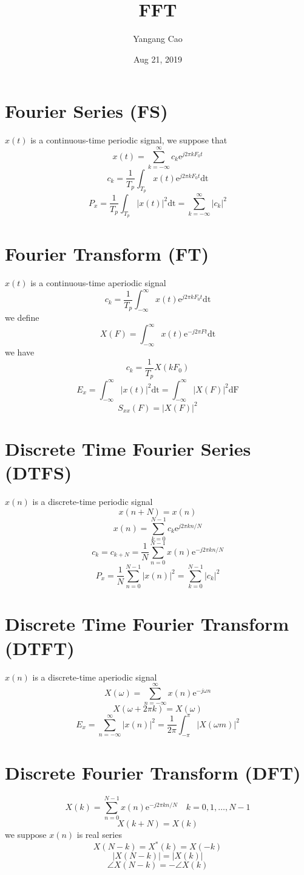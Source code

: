 \documentclass[10pt,a4paper,oneside]{article}
\author{Yangang Cao}
\date{Aug 21, 2019}
\begin{document}
\title{FFT}
\maketitle 
\tableofcontents
\newpage
\section{Fourier Series (FS)}
$x(t)$ is a continuous-time periodic signal, we suppose that
\[
x(t)=\sum_{k=-\infty}^{\infty}c_k\mathrm{e}^{j2\pi kF_0t}
\]
\[
c_k=\frac{1}{T_p}\int_{T_p}x(t)\mathrm{e}^{j2\pi kF_0t}\mathrm{dt}
\]
\[
P_x=\frac{1}{T_p}\int_{T_p}|x(t)|^2\mathrm{dt}=\sum_{k=-\infty}^{\infty}|c_k|^2
\]
\section{Fourier Transform (FT)}
$x(t)$ is a continuous-time aperiodic signal
\[
c_k=\frac{1}{T_p}\int_{-\infty}^{\infty}x(t)\mathrm{e}^{j2\pi kF_0t}\mathrm{dt}
\]
we define
\[
X(F)=\int_{-\infty}^{\infty}x(t)\mathrm{e}^{-j2\pi Ft}\mathrm{dt}
\]
we have
\[
c_k=\frac{1}{T_p}X(kF_0)
\]
\[
E_x=\int_{-\infty}^{\infty}|x(t)|^2\mathrm{dt}=\int_{-\infty}^{\infty}|X(F)|^2\mathrm{dF}
\]
\[
S_{xx}(F)=|X(F)|^2
\]
\section{Discrete Time Fourier Series (DTFS)}
$x(n)$ is a discrete-time periodic signal
\[
x(n+N)=x(n)
\]
\[
x(n)=\sum_{k=0}^{N-1}c_k\mathrm{e}^{j2\pi kn/N}
\]
\[
c_k=c_{k+N}=\frac{1}{N}\sum_{n=0}^{N-1}x(n)\mathrm{e}^{-j2\pi kn/N}
\]
\[
P_x=\frac{1}{N}\sum_{n=0}^{N-1}|x(n)|^2=\sum_{k=0}^{N-1}|c_k|^2
\]
\section{Discrete Time Fourier Transform (DTFT)}
$x(n)$ is a discrete-time aperiodic signal
\[
X(\omega)=\sum_{n=-\infty}^{\infty}x(n)\mathrm{e}^{-j\omega n}
\]
\[
X(\omega+2\pi k)=X(\omega)
\]
\[
E_x=\sum_{n=-\infty}^{\infty}|x(n)|^2=\frac{1}{2\pi}\int_{-\pi}^{\pi}|X(\omega m)|^2
\]
\section{Discrete Fourier Transform (DFT)}
\[
X(k)=\sum_{n=0}^{N-1}x(n)\mathrm{e}^{-j2\pi kn/N}\quad k=0,1,\dots,N-1
\]
\[
X(k+N)=X(k)
\]
we suppose $x(n)$ is real series
\[
X(N-k)=X^*(k)=X(-k)
\]
\[
|X(N-k)|=|X(k)|
\]
\[
\angle X(N-k)=-\angle X(k)
\]
\end{document}
